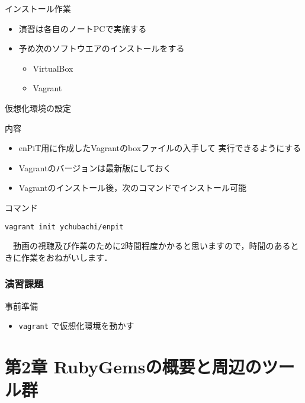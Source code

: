 \documentclass[t, aspectratio=169]{beamer}
\begin{document}
\begin{frame}[label=sec-1-1-4]{インストール作業}
\begin{itemize}
\item 演習は各自のノートPCで実施する
\item 予め次のソフトウエアのインストールをする
\begin{itemize}
\item VirtualBox
\item Vagrant
\end{itemize}
\end{itemize}
\end{frame}

\begin{frame}[fragile,label=sec-1-1-5]{仮想化環境の設定}
 \begin{block}{内容}
\begin{itemize}
\item enPiT用に作成したVagrantのboxファイルの入手して
実行できるようにする

\item Vagrantのバージョンは最新版にしておく

\item Vagrantのインストール後，次のコマンドでインストール可能
\end{itemize}
\end{block}

\begin{block}{コマンド}
\begin{verbatim}
vagrant init ychubachi/enpit
\end{verbatim}


　動画の視聴及び作業のために2時間程度かかると思いますので，時間のあるときに作業をおねがいします．
\end{block}
\end{frame}

\section{演習課題}
\label{sec-1-2}
\begin{frame}[fragile,label=sec-1-2-1]{事前準備}
 \begin{itemize}
\item \texttt{vagrant} で仮想化環境を動かす
\end{itemize}
\end{frame}
\part{第2章 RubyGemsの概要と周辺のツール群}
\label{sec-2}
\end{document}
